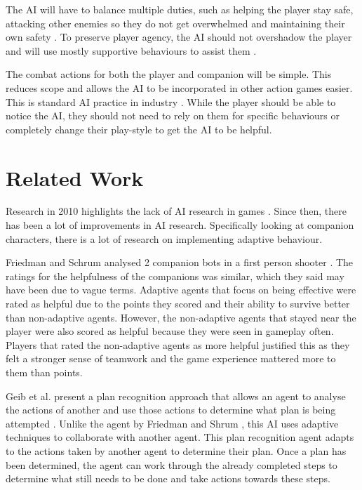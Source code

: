 \documentclass{IEEEtran}
\begin{document}
The AI will have to balance multiple duties, such as helping the player stay safe, attacking other enemies so they do not get overwhelmed and maintaining their own safety \cite{CoupledEmpowermentMaximisation, tremblay2013adaptive}. To preserve player agency, the AI should not overshadow the player and will use mostly supportive behaviours to assist them \cite{DesignDocAIAllies}.

The combat actions for both the player and companion will be simple. This reduces scope and allows the AI to be incorporated in other action games easier. This is standard AI practice in industry \cite{GMTGoodAI, GDCLessIsMore, GDCSimplestAITrick}. While the player should be able to notice the AI, they should not need to rely on them for specific behaviours or completely change their play-style to get the AI to be helpful.

\section{Related Work}
\label{RelatedWork}

Research in 2010 highlights the lack of AI research in games \cite{RealTimeAICritique2010}. Since then, there has been a lot of improvements in AI research. Specifically looking at companion characters, there is a lot of research on implementing adaptive behaviour.

Friedman and Schrum analysed 2 companion bots in a first person shooter \cite{CompanionBotsFPS2019}. The ratings for the helpfulness of the companions was similar, which they said may have been due to vague terms. Adaptive agents that focus on being effective were rated as helpful due to the points they scored and their ability to survive better than non-adaptive agents. However, the non-adaptive agents that stayed near the player were also scored as helpful because they were seen in gameplay often. Players that rated the non-adaptive agents as more helpful justified this as they felt a stronger sense of teamwork and the game experience mattered more to them than points.

Geib et al. present a plan recognition approach that allows an agent to analyse the actions of another and use those actions to determine what plan is being attempted \cite{GeneratingCollabBehaviourPlanRecognition2016}. Unlike the agent by Friedman and Shrum \cite{CompanionBotsFPS2019}, this AI uses adaptive techniques to collaborate with another agent. This plan recognition agent adapts to the actions taken by another agent to determine their plan. Once a plan has been determined, the agent can work through the already completed steps to determine what still needs to be done and take actions towards these steps.
\end{document}
